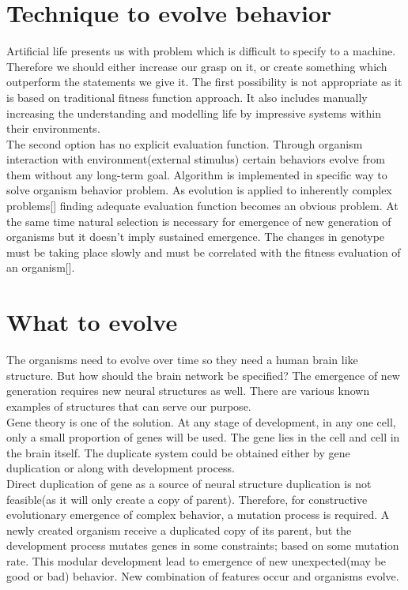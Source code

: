 \documentclass[conference]{IEEEtran}
\begin{document}
\section{Technique to evolve behavior}
Artificial life presents us with problem which is difficult to specify to a machine. Therefore we should either increase our grasp on it, or create something which outperform the statements we give it. The first possibility is not appropriate as it is based on traditional fitness function approach. It also includes manually increasing the understanding and modelling life by impressive systems within their environments.\\
The second option has no explicit evaluation function. Through organism interaction with environment(external stimulus) certain behaviors evolve from them without any long-term goal. Algorithm is implemented in specific way to solve organism behavior problem. As evolution is applied to inherently complex problems[] finding adequate evaluation function becomes an obvious problem. At the same time natural selection is necessary for emergence of new generation of organisms but it doesn't imply sustained emergence. The changes in genotype must be taking place slowly and must be correlated with the fitness evaluation of an organism[].

\section{What to evolve}
The organisms need to evolve over time so they need a human brain like structure. But how should the brain network be specified? The emergence of new generation requires new neural structures as well. There are various known examples of structures that can serve our purpose.\\
Gene theory is one of the solution. At any stage of development, in any one cell, only a small proportion of genes will be used. The gene lies in the cell and cell in the brain itself. The duplicate system could be obtained either by gene duplication or along with development process.\\
Direct duplication of gene as a source of neural structure duplication is not feasible(as it will only create a copy of parent). Therefore, for constructive evolutionary emergence of complex behavior, a mutation process is required. A newly created organism receive a duplicated copy of its parent, but the development process mutates genes in some constraints; based on some mutation rate. This modular development lead to emergence of new unexpected(may be good or bad) behavior. New combination of features occur and organisms evolve.
\end{document}
